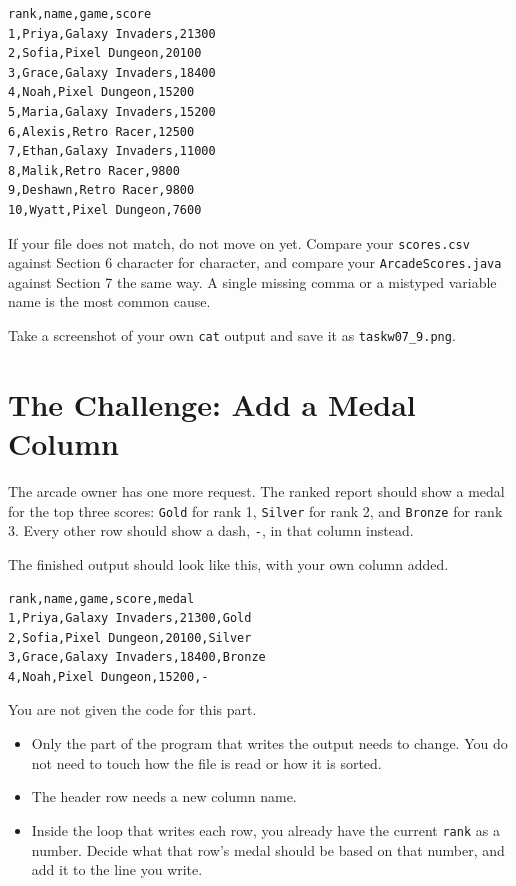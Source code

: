 \documentclass[11pt]{article}
\begin{document}
\begin{lstlisting}[language={}]
rank,name,game,score
1,Priya,Galaxy Invaders,21300
2,Sofia,Pixel Dungeon,20100
3,Grace,Galaxy Invaders,18400
4,Noah,Pixel Dungeon,15200
5,Maria,Galaxy Invaders,15200
6,Alexis,Retro Racer,12500
7,Ethan,Galaxy Invaders,11000
8,Malik,Retro Racer,9800
9,Deshawn,Retro Racer,9800
10,Wyatt,Pixel Dungeon,7600
\end{lstlisting}

If your file does not match, do not move on yet. Compare your
\texttt{scores.csv} against Section 6 character for character, and compare
your \texttt{ArcadeScores.java} against Section 7 the same way. A single
missing comma or a mistyped variable name is the most common cause.

Take a screenshot of your own \texttt{cat} output and save it as
\texttt{taskw07\_9.png}.

\section{The Challenge: Add a Medal Column}

The arcade owner has one more request. The ranked report should show a
medal for the top three scores: \texttt{Gold} for rank 1, \texttt{Silver}
for rank 2, and \texttt{Bronze} for rank 3. Every other row should show a
dash, \texttt{-}, in that column instead.

The finished output should look like this, with your own column added.

\begin{lstlisting}[language={}]
rank,name,game,score,medal
1,Priya,Galaxy Invaders,21300,Gold
2,Sofia,Pixel Dungeon,20100,Silver
3,Grace,Galaxy Invaders,18400,Bronze
4,Noah,Pixel Dungeon,15200,-
\end{lstlisting}

You are not given the code for this part.

\begin{itemize}
  \item Only the part of the program that writes the output needs to
    change. You do not need to touch how the file is read or how it is
    sorted.
  \item The header row needs a new column name.
  \item Inside the loop that writes each row, you already have the current
    \texttt{rank} as a number. Decide what that row's medal should be based
    on that number, and add it to the line you write.
\end{itemize}
\end{document}
